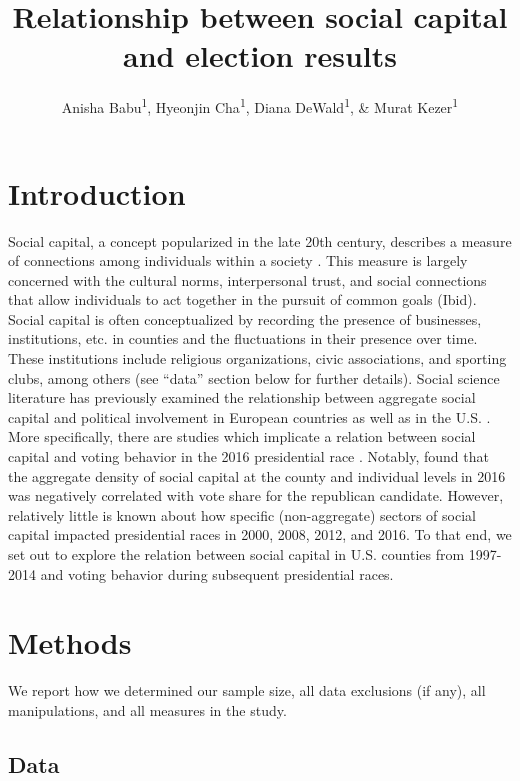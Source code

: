 \documentclass[
  english,
  man]{apa6}
\title{Relationship between social capital and election results}
\author{Anisha Babu\textsuperscript{1}, Hyeonjin Cha\textsuperscript{1}, Diana DeWald\textsuperscript{1}, \& Murat Kezer\textsuperscript{1}}
\date{}
\affiliation{\vspace{0.5cm}\textsuperscript{1} University of Oregon}
\begin{document}
\maketitle

\hypertarget{introduction}{%
\section{Introduction}\label{introduction}}

Social capital, a concept popularized in the late 20th century, describes a measure of connections among individuals within a society \autocite{putnam2000}. This measure is largely concerned with the cultural norms, interpersonal trust, and social connections that allow individuals to act together in the pursuit of common goals (Ibid). Social capital is often conceptualized by recording the presence of businesses, institutions, etc. in counties and the fluctuations in their presence over time. These institutions include religious organizations, civic associations, and sporting clubs, among others (see \enquote{data} section below for further details). Social science literature has previously examined the relationship between aggregate social capital and political involvement in European countries \autocites[e.g.,][]{morales2016}{jottier2012} as well as in the U.S. \autocite{la1998}.\\
More specifically, there are studies which implicate a relation between social capital and voting behavior in the 2016 presidential race \autocite[such as][]{lee2020}. Notably, \textcite{giuliano2020} found that the aggregate density of social capital at the county and individual levels in 2016 was negatively correlated with vote share for the republican candidate. However, relatively little is known about how specific (non-aggregate) sectors of social capital impacted presidential races in 2000, 2008, 2012, and 2016. To that end, we set out to explore the relation between social capital in U.S. counties from 1997-2014 and voting behavior during subsequent presidential races.

\hypertarget{methods}{%
\section{Methods}\label{methods}}

We report how we determined our sample size, all data exclusions (if any), all manipulations, and all measures in the study.

\hypertarget{data}{%
\subsection{Data}\label{data}}
\end{document}
